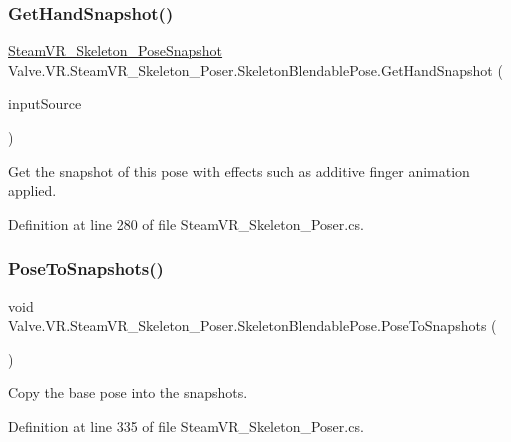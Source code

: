 \subsubsection{\texorpdfstring{GetHandSnapshot()}{GetHandSnapshot()}}
{\footnotesize\ttfamily \mbox{\hyperlink{class_valve_1_1_v_r_1_1_steam_v_r___skeleton___pose_snapshot}{Steam\+V\+R\+\_\+\+Skeleton\+\_\+\+Pose\+Snapshot}} Valve.\+V\+R.\+Steam\+V\+R\+\_\+\+Skeleton\+\_\+\+Poser.\+Skeleton\+Blendable\+Pose.\+Get\+Hand\+Snapshot (\begin{DoxyParamCaption}\item[{\mbox{\hyperlink{namespace_valve_1_1_v_r_a82e5bf501cc3aa155444ee3f0662853f}{Steam\+V\+R\+\_\+\+Input\+\_\+\+Sources}}}]{input\+Source }\end{DoxyParamCaption})}



Get the snapshot of this pose with effects such as additive finger animation applied. 



Definition at line 280 of file Steam\+V\+R\+\_\+\+Skeleton\+\_\+\+Poser.\+cs.

\mbox{\label{class_valve_1_1_v_r_1_1_steam_v_r___skeleton___poser_1_1_skeleton_blendable_pose_a208239c9a4a9d5a1646f6b65990656c8}} 
\subsubsection{\texorpdfstring{PoseToSnapshots()}{PoseToSnapshots()}}
{\footnotesize\ttfamily void Valve.\+V\+R.\+Steam\+V\+R\+\_\+\+Skeleton\+\_\+\+Poser.\+Skeleton\+Blendable\+Pose.\+Pose\+To\+Snapshots (\begin{DoxyParamCaption}{ }\end{DoxyParamCaption})}



Copy the base pose into the snapshots. 



Definition at line 335 of file Steam\+V\+R\+\_\+\+Skeleton\+\_\+\+Poser.\+cs.

\mbox{\label{class_valve_1_1_v_r_1_1_steam_v_r___skeleton___poser_1_1_skeleton_blendable_pose_a9ba8aba4e79dfea62b88efb174cac0cc}} 
